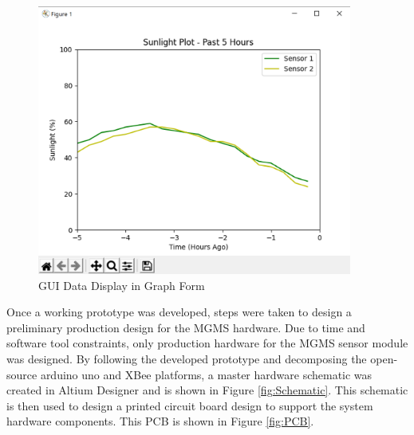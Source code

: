 \documentclass{report}
\begin{document}
\begin{figure}[H] %
    \centering
    \includegraphics[height=3.5in]{PNGs/GUIGRaph.png}
    \caption{GUI Data Display in Graph Form}
    \label{fig:Graph}
\end{figure}

\newpage
Once a working prototype was developed, steps were taken to design a preliminary production design for the MGMS hardware. Due to time and software tool constraints, only production hardware for the MGMS sensor module was designed. By following the developed prototype and decomposing the open-source arduino uno and XBee platforms, a master hardware schematic was created in Altium Designer and is shown in Figure \ref{fig:Schematic}. This schematic is then used to design a printed circuit board design to support the system hardware components. This PCB is shown in Figure \ref{fig:PCB}.\\
\end{document}
